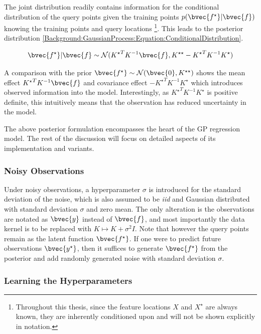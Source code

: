 			The joint distribution readily contains information for the conditional distribution of the query points given the training points $p(\bvec{f^{\star}} | \bvec{f})$ knowing the training points and query locations \footnote{Throughout this thesis, since the feature locations $X$ and $X^{\star}$ are always known, they are inherently conditioned upon and will not be shown explicitly in notation.}. This leads to the posterior distribution \eqref{Background:GaussianProcess:Equation:ConditionalDistribution}.
			
			\begin{equation}
				\bvec{f^{\star}} | \bvec{f} \sim \mathcal{N}({K^{\star}}^{T} K^{-1} \bvec{f}, K^{\star \star} - {K^{\star}}^{T} K^{-1} K^{\star})
			\label{Background:GaussianProcess:Equation:ConditionalDistribution}
			\end{equation}						
			
			A comparison with the prior $\bvec{f^{\star}} \sim \mathcal{N}(\bvec{0}, K^{\star \star})$ shows the mean effect ${K^{\star}}^{T} K^{-1} \bvec{f}$ and covariance effect $- {K^{\star}}^{T} K^{-1} K^{\star}$ which introduces observed information into the model. Interestingly, as ${K^{\star}}^{T} K^{-1} K^{\star}$ is positive definite, this intuitively means that the observation has reduced uncertainty in the model.
			
			The above posterior formulation encompasses the heart of the GP regression model. The rest of the discussion will focus on detailed aspects of its implementation and variants.
			
			\subsubsection{Noisy Observations}
			
				Under noisy observations, a hyperparameter $\sigma$ is introduced for the standard deviation of the noise, which is also assumed to be \textit{iid} and Gaussian distributed with standard deviation $\sigma$ and zero mean. The only alteration is the observations are notated as $\bvec{y}$ instead of $\bvec{f}$, and most importantly the data kernel is to be replaced with $K \mapsto K + \sigma^{2} I$. Note that however the query points remain as the latent function $\bvec{f^{\star}}$. If one were to predict future observations $\bvec{y^{\star}}$, then it suffices to generate $\bvec{f^{\star}}$ from the posterior and add randomly generated noise with standard deviation $\sigma$.
				
			\subsubsection{Learning the Hyperparameters}
			
